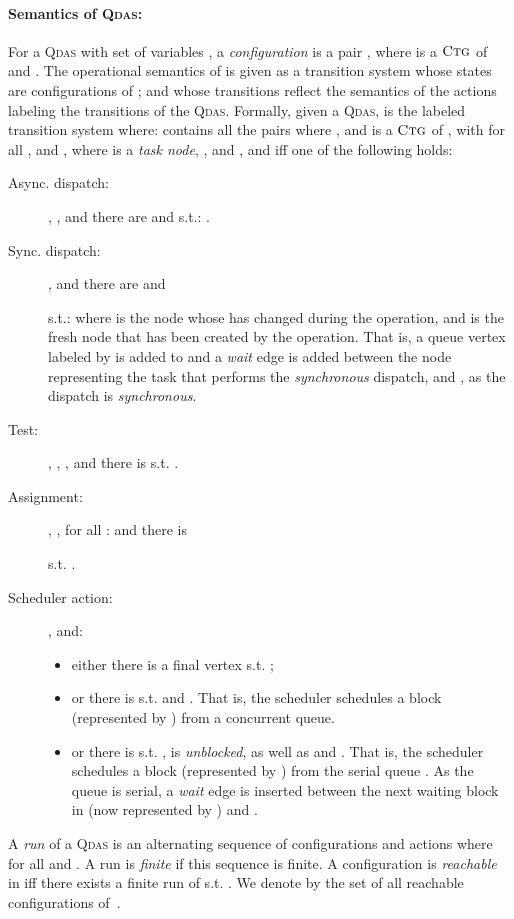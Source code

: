 \documentclass[runningheads,oribibl,]{article}
\newcommand{\qdas}{\textsc{Qdas}\xspace}
\newcommand{\ctg}{\ensuremath{\textsc{Ctg}}\xspace}
\begin{document}
\paragraph{\bf Semantics of \qdas:} For a \qdas  with set of variables
, a \emph{configuration} is a pair , where
 is a \ctg of  and .  The
operational semantics of  is given as a transition system
 whose states are configurations of ; and whose
transitions reflect the semantics of the actions labeling the
transitions of the \qdas. Formally, given a \qdas ,
 is the labeled transition system  where:   contains all the pairs
 where , and  is a \ctg
of ,   with  for
all , and , where  is a \emph{task node},
,  and
,   and 
 iff
one of the following holds:
\begin{description}
\item[Async. dispatch:] , , and
  there are  and
   s.t.:
  .
\item[Sync. dispatch:] ,  and there
  are  and
  
  s.t.: 
  where  is the node whose  has changed during the 
  operation, and  is the fresh node that has been created by the
   operation. That is, a queue vertex  labeled by
   is added to  and a \emph{wait} edge is added between the
  node  representing the task that performs the \emph{synchronous}
  dispatch, and , as the dispatch is \emph{synchronous}.
\item[Test:] , , ,
  and there is  s.t.
  .
\item[Assignment:] , , for
  all :  and there is
  
  s.t. .
\item[Scheduler action:] ,  and:
  \begin{itemize}
  \item either there is a final vertex 
    s.t. ;
  \item or there is  s.t.  and
    . That is, the scheduler schedules a
    block (represented by ) from a concurrent queue.
  \item or there is  s.t.  ,  is
    \emph{unblocked}, as well as  and
    . That is, the scheduler schedules a
    block (represented by ) from the serial queue . As the queue
    is serial, a \emph{wait} edge is inserted between the next waiting
    block in  (now represented by ) and .
  \end{itemize}

 \end{description}


 A \emph{run}  of a \qdas is an alternating sequence  of configurations and actions where
  for all  and
 . A run is \emph{finite} if this sequence is
 finite.
 A configuration  is \emph{reachable} in  iff there
 exists a finite run  of  s.t. . We
 denote by  the set of all reachable configurations
 of~.
\end{document}
